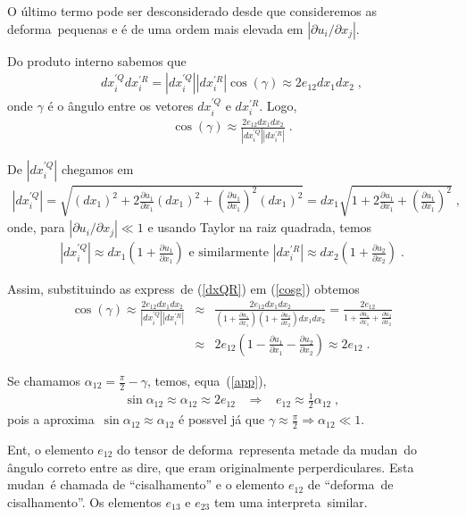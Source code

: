 \begin{itemize}
O \'ultimo termo pode ser desconsiderado desde que consideremos
as deforma\coes\ pequenas e \'e de uma ordem mais elevada em
$|\partial u_i/ \partial x_j|$.

Do produto interno sabemos que
\begin{eqnarray}
dx_i^{'Q} dx_i^{'R} = |dx_i^{'Q}| |dx_i^{'R}| \cos(\gamma)
\approx  2e_{12}dx_1 dx_2 \; ,
\end{eqnarray}
onde $\gamma$ \'e o \^angulo entre os vetores $dx_i^{'Q}$ e
$dx_i^{'R}$. Logo,
\begin{eqnarray} \label{cosg}
\cos(\gamma) \approx  \frac{2e_{12}dx_1 dx_2}{|dx_i^{'Q}|
|dx_i^{'R}|} \; .
\end{eqnarray}

De $|dx_i^{'Q}|$ chegamos em
\begin{eqnarray*}
|dx_i^{'Q}| = \sqrt{(dx_1)^2 + 2 \frac{\partial u_1}{\partial x_1}
(dx_1)^2 + \left( \frac{\partial u_1}{\partial x_1} \right)^2
(dx_1)^2} = dx_1 \sqrt{1 + 2 \frac{\partial u_1}{\partial x_1}
+ \left( \frac{\partial u_1}{\partial x_1} \right)^2} \; ,
\end{eqnarray*}
onde, para $|\partial u_i/ \partial x_j| \ll 1$ e usando Taylor na
raiz quadrada, temos
\begin{eqnarray} \label{dxQR}
|dx_i^{'Q}| \approx dx_1 \left(1+\frac{\partial u_1}{\partial x_1}\right)
\mbox{ e similarmente } |dx_i^{'R}|
\approx dx_2 \left(1+\frac{\partial u_2}{\partial x_2}\right) \; .
\end{eqnarray}

Assim, substituindo as express\oes\ de (\ref{dxQR}) em (\ref{cosg})
obtemos
\begin{eqnarray} \label{app}
\cos(\gamma) \approx  \frac{2e_{12}dx_1 dx_2}{|dx_i^{'Q}|
|dx_i^{'R}|} &\approx& \frac{2e_{12}dx_1 dx_2}{\left(1+\frac{\partial u_1}
{\partial x_1}\right) \left(1+\frac{\partial u_2}{\partial x_2}
\right) dx_1  dx_2} = \frac{2e_{12}}{1 + \frac{\partial u_1}
{\partial x_1} + \frac{\partial u_2}{\partial x_2}} \nonumber \\
&\approx& 2e_{12} \left(1 - \frac{\partial u_1}{\partial x_1} -
\frac{\partial u_2}{\partial x_2} \right) \approx 2e_{12} \; .
\end{eqnarray}

Se chamamos $\alpha_{12} = \frac{\pi}{2} - \gamma$, temos,
equa\cao\ (\ref{app}),
\begin{eqnarray}
\sin \alpha_{12} \approx  \alpha_{12} \approx 2e_{12} \;\;\;\Rightarrow
\;\;\; e_{12} \approx \frac{1}{2} \alpha_{12} \; ,
\end{eqnarray}
pois a aproxima\cao\ $\sin \alpha_{12} \approx  \alpha_{12}$ \'e
poss\ih vel j\'a que $\gamma \approx  \frac{\pi}{2} \Rightarrow
\alpha_{12} \ll 1$.

Ent\ao, o elemento $e_{12}$ do tensor de deforma\cao\ representa
metade da mudan\ca\ do \^angulo correto entre as dire\coes, que
eram originalmente perperdiculares. Esta mudan\ca\ \'e chamada
de ``cisalhamento''  e o elemento $e_{12}$ de ``deforma\cao\ de
cisalhamento''. Os elementos $e_{13}$ e $e_{23}$ tem uma
interpreta\cao\ similar.

\end{itemize}

